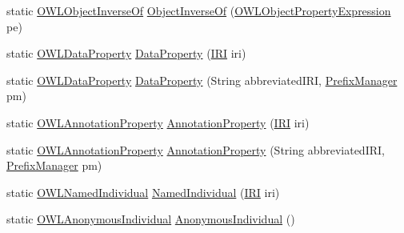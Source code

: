 \begin{DoxyCompactItemize}
\item 
static \hyperlink{interfaceorg_1_1semanticweb_1_1owlapi_1_1model_1_1_o_w_l_object_inverse_of}{O\-W\-L\-Object\-Inverse\-Of} \hyperlink{classorg_1_1semanticweb_1_1owlapi_1_1apibinding_1_1_o_w_l_functional_syntax_factory_a3b9ca9f9ecf40870b7075179f62af158}{Object\-Inverse\-Of} (\hyperlink{interfaceorg_1_1semanticweb_1_1owlapi_1_1model_1_1_o_w_l_object_property_expression}{O\-W\-L\-Object\-Property\-Expression} pe)
\item 
static \hyperlink{interfaceorg_1_1semanticweb_1_1owlapi_1_1model_1_1_o_w_l_data_property}{O\-W\-L\-Data\-Property} \hyperlink{classorg_1_1semanticweb_1_1owlapi_1_1apibinding_1_1_o_w_l_functional_syntax_factory_a01e38099fc7a8c8e308f08a72d54e5d1}{Data\-Property} (\hyperlink{classorg_1_1semanticweb_1_1owlapi_1_1model_1_1_i_r_i}{I\-R\-I} iri)
\item 
static \hyperlink{interfaceorg_1_1semanticweb_1_1owlapi_1_1model_1_1_o_w_l_data_property}{O\-W\-L\-Data\-Property} \hyperlink{classorg_1_1semanticweb_1_1owlapi_1_1apibinding_1_1_o_w_l_functional_syntax_factory_a05d3e3dbceb0f00874e21693b6d43081}{Data\-Property} (String abbreviated\-I\-R\-I, \hyperlink{interfaceorg_1_1semanticweb_1_1owlapi_1_1model_1_1_prefix_manager}{Prefix\-Manager} pm)
\item 
static \hyperlink{interfaceorg_1_1semanticweb_1_1owlapi_1_1model_1_1_o_w_l_annotation_property}{O\-W\-L\-Annotation\-Property} \hyperlink{classorg_1_1semanticweb_1_1owlapi_1_1apibinding_1_1_o_w_l_functional_syntax_factory_acffd585ae0f333076d8b34166c0e9522}{Annotation\-Property} (\hyperlink{classorg_1_1semanticweb_1_1owlapi_1_1model_1_1_i_r_i}{I\-R\-I} iri)
\item 
static \hyperlink{interfaceorg_1_1semanticweb_1_1owlapi_1_1model_1_1_o_w_l_annotation_property}{O\-W\-L\-Annotation\-Property} \hyperlink{classorg_1_1semanticweb_1_1owlapi_1_1apibinding_1_1_o_w_l_functional_syntax_factory_ae1dba413972a5d993c2270f2bd83c395}{Annotation\-Property} (String abbreviated\-I\-R\-I, \hyperlink{interfaceorg_1_1semanticweb_1_1owlapi_1_1model_1_1_prefix_manager}{Prefix\-Manager} pm)
\item 
static \hyperlink{interfaceorg_1_1semanticweb_1_1owlapi_1_1model_1_1_o_w_l_named_individual}{O\-W\-L\-Named\-Individual} \hyperlink{classorg_1_1semanticweb_1_1owlapi_1_1apibinding_1_1_o_w_l_functional_syntax_factory_a6074991616add76424b429f4790408fd}{Named\-Individual} (\hyperlink{classorg_1_1semanticweb_1_1owlapi_1_1model_1_1_i_r_i}{I\-R\-I} iri)
\item 
static \hyperlink{interfaceorg_1_1semanticweb_1_1owlapi_1_1model_1_1_o_w_l_anonymous_individual}{O\-W\-L\-Anonymous\-Individual} \hyperlink{classorg_1_1semanticweb_1_1owlapi_1_1apibinding_1_1_o_w_l_functional_syntax_factory_a5a399383c3b69c97d91b56055066b871}{Anonymous\-Individual} ()

\end{DoxyCompactItemize}
